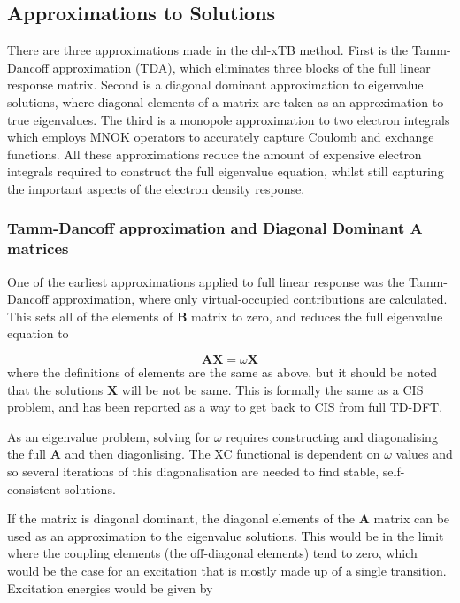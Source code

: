 \subsection{Approximations to Solutions}
\label{subsec:chl_approxs}

There are three approximations made in the chl-xTB method. First is the Tamm-Dancoff 
approximation (TDA), which eliminates three blocks of the full linear response matrix.
Second is a diagonal dominant approximation to eigenvalue solutions, where diagonal 
elements of a matrix are taken as an approximation to true eigenvalues. The third
is a monopole approximation to two electron integrals which employs MNOK operators 
to accurately capture Coulomb and exchange functions. All these approximations 
reduce the amount of expensive electron integrals required to construct the full
eigenvalue equation, whilst still capturing the important aspects of the electron 
density response.

\subsubsection{Tamm-Dancoff approximation and Diagonal Dominant $\mathbf{A}$ matrices}
\label{subsubsec:Tamm_Dancoff}

One of the earliest approximations applied to full linear response was the Tamm-Dancoff
approximation, where only virtual-occupied contributions are calculated. This sets
all of the elements of $\mathbf{B}$ matrix to zero, and reduces the full eigenvalue 
equation to 

\begin{equation}
\mathbf{A} \mathbf{X} = \omega \mathbf{X}
\end{equation}
%
where the definitions of elements are the same as above, but it should be noted 
that the solutions $\mathbf{X}$ will be not be same. This is formally the same as
a CIS problem, and has been reported as a way to get back to CIS from full
TD-DFT.

As an eigenvalue problem, solving for $\omega$ requires constructing and diagonalising
the full $\mathbf{A}$ and then diagonlising. The XC functional is dependent on 
$\omega$ values and so several iterations of this diagonalisation are needed to
find stable, self-consistent solutions.

If the matrix is diagonal dominant, the diagonal elements of the $\mathbf{A}$ matrix 
can be used as an approximation to the eigenvalue solutions. This would be in the 
limit where the coupling elements (the off-diagonal elements) tend to zero, which
would be the case for an excitation that is mostly made up of a single transition.
Excitation energies would be given by

